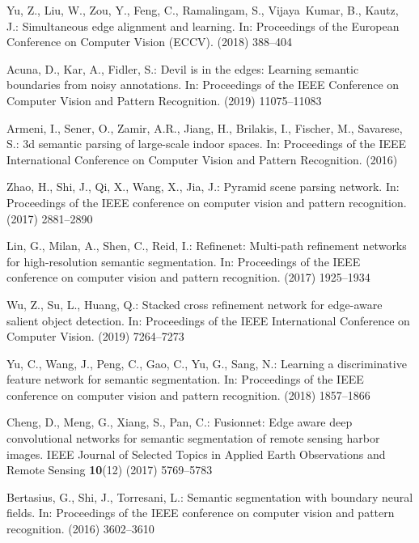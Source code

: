 \documentclass[runningheads]{llncs}
\begin{document}
\begin{thebibliography}{10}
Yu, Z., Liu, W., Zou, Y., Feng, C., Ramalingam, S., Vijaya~Kumar, B., Kautz,
  J.:
\newblock Simultaneous edge alignment and learning.
\newblock In: Proceedings of the European Conference on Computer Vision (ECCV).
  (2018)  388--404

Acuna, D., Kar, A., Fidler, S.:
\newblock Devil is in the edges: Learning semantic boundaries from noisy
  annotations.
\newblock In: Proceedings of the IEEE Conference on Computer Vision and Pattern
  Recognition. (2019)  11075--11083

Armeni, I., Sener, O., Zamir, A.R., Jiang, H., Brilakis, I., Fischer, M.,
  Savarese, S.:
\newblock 3d semantic parsing of large-scale indoor spaces.
\newblock In: Proceedings of the IEEE International Conference on Computer
  Vision and Pattern Recognition. (2016)

Zhao, H., Shi, J., Qi, X., Wang, X., Jia, J.:
\newblock Pyramid scene parsing network.
\newblock In: Proceedings of the IEEE conference on computer vision and pattern
  recognition. (2017)  2881--2890

Lin, G., Milan, A., Shen, C., Reid, I.:
\newblock Refinenet: Multi-path refinement networks for high-resolution
  semantic segmentation.
\newblock In: Proceedings of the IEEE conference on computer vision and pattern
  recognition. (2017)  1925--1934

Wu, Z., Su, L., Huang, Q.:
\newblock Stacked cross refinement network for edge-aware salient object
  detection.
\newblock In: Proceedings of the IEEE International Conference on Computer
  Vision. (2019)  7264--7273

Yu, C., Wang, J., Peng, C., Gao, C., Yu, G., Sang, N.:
\newblock Learning a discriminative feature network for semantic segmentation.
\newblock In: Proceedings of the IEEE conference on computer vision and pattern
  recognition. (2018)  1857--1866

Cheng, D., Meng, G., Xiang, S., Pan, C.:
\newblock Fusionnet: Edge aware deep convolutional networks for semantic
  segmentation of remote sensing harbor images.
\newblock IEEE Journal of Selected Topics in Applied Earth Observations and
  Remote Sensing \textbf{10}(12) (2017)  5769--5783

Bertasius, G., Shi, J., Torresani, L.:
\newblock Semantic segmentation with boundary neural fields.
\newblock In: Proceedings of the IEEE conference on computer vision and pattern
  recognition. (2016)  3602--3610


\end{thebibliography}
\end{document}
